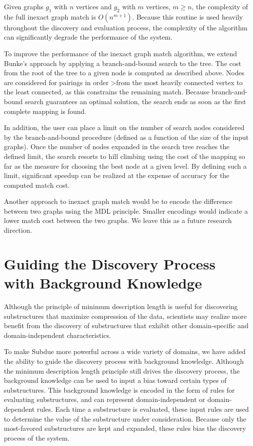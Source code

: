 
Given graphs $g_1$ with $n$ vertices and $g_2$ with $m$ vertices, \(m \geq n\),
the complexity of the full inexact graph match is \(O(n^{m+1})\).
Because this routine is used heavily throughout the discovery and evaluation
process, the complexity of the algorithm can significantly degrade the
performance of the system.

To improve the performance of the inexact graph match algorithm, we
extend Bunke's approach by
applying a branch-and-bound search to the tree.  The cost from the root of
the tree to a given node is computed
as described above.  Nodes are considered for pairings in order
>from the most heavily connected vertex to the least connected, as this
constrains
the remaining match.  Because branch-and-bound search guarantees an optimal
solution, the search ends as soon as the first complete mapping is found.

In addition, the user can place a limit on the number of search nodes
considered by the branch-and-bound procedure
(defined as a function of the size of the input graphs).
Once the number of nodes expanded in the search tree reaches the defined
limit, the search resorts to hill climbing using the cost of the mapping
so far as the
measure for choosing the best node at a given level.
By defining such a limit, significant speedup can be realized
at the expense of accuracy for the computed match cost.

Another approach to inexact graph match would be to
encode the difference between two graphs using the MDL principle.
Smaller encodings would indicate a lower match cost between
the two graphs.  We leave this as a future research direction.

\section{Guiding the Discovery Process with Background Knowledge}
\label{s:bk}

Although the principle of minimum description length is useful for discovering
substructures that maximize compression of the data, scientists may
realize more benefit from the discovery of substructures that exhibit
other domain-specific and domain-independent characteristics.

To make {\sc Subdue} more powerful across a wide variety of domains, we have
added the ability to guide the discovery process with background knowledge.
Although the minimum description length principle still drives the discovery
process, the background knowledge can be used to input a bias toward certain
types of substructures.
This background knowledge is encoded in the form of rules for evaluating
substructures, and can represent domain-independent or domain-dependent
rules.  Each time a substructure is evaluated, these input rules are
used to determine the value of the substructure under consideration.  Because
only the most-favored substructures are kept and expanded, these rules
bias the discovery process of the system.

